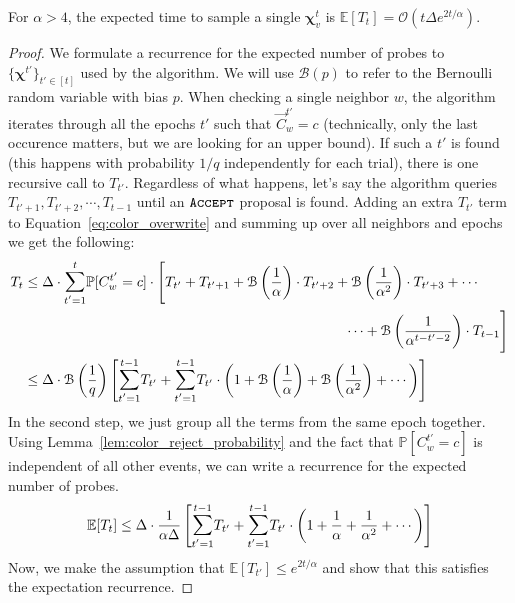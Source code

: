 \begin{lemma}
\label{lem:coloring_recurrence}
For $\alpha>4$, the expected time to sample a single $\bm\chi^t_v$ is $\mathbb E[T_t] = \mathcal{O}\left(t\Delta e^{2t/\alpha}\right)$.
\end{lemma}
\begin{proof}
We formulate a recurrence for the expected number of probes to $\{\bm\chi^{t'}\}_{t'\in[t]}$ used by the algorithm.
We will use $\mathcal B(p)$ to refer to the Bernoulli random variable with bias $p$.
When checking a single neighbor $w$, the algorithm iterates through all the epochs $t'$ such that $\vec C^{t'}_w = c$
(technically, only the last occurence matters, but we are looking for an upper bound).
If such a $t'$ is found (this happens with probability $1/q$ independently for each trial), there is one recursive call to $T_{t'}$.
Regardless of what happens, let's say the algorithm queries $T_{t'+1}, T_{t'+2}, \cdots, T_{t-1}$ until an $\texttt{\textsc{Accept}}$ proposal is found.
Adding an extra $T_{t'}$ term to Equation~\ref{eq:color_overwrite} and summing up over all neighbors and epochs we get the following:
\begin{align}
T_{t} &\le \Delta \cdot \mathlarger\sum\limits_{t'=1}^{t} \mathbb P[C^{t'}_w = c]\cdot
\Biggl[ T_{t'} + T_{t'+1} + \mathcal B\left(\frac{1}{\alpha}\right)\cdot T_{t'+2}
+ \mathcal B\left(\frac{1}{\alpha^2}\right)\cdot T_{t'+3} + \cdots\\
&\hspace{23em}
\cdots + \mathcal B\left(\frac{1}{\alpha^{t-t'-2}}\right)\cdot T_{t-1} \Biggr]\\
&\le \Delta\cdot\mathcal B\left( \frac{1}{q}\right) \Biggl[
\mathlarger\sum\limits_{t'=1}^{t-1} T_{t'} +
\mathlarger\sum\limits_{t'=1}^{t-1} T_{t'}\cdot \left(1 + \mathcal B\left(\frac1\alpha\right) + \mathcal B\left(\frac1{\alpha^2}\right) + \cdots\right)
\Biggr]
\end{align}
In the second step, we just group all the terms from the same epoch together.
Using Lemma~\ref{lem:color_reject_probability} and the fact that $\mathbb P[C^{t'}_w = c]$ is independent of all other events,
we can write a recurrence for the expected number of probes.
\begin{align}
\mathbb E[T_t]\le \Delta\cdot\frac{1}{\alpha\Delta}
\left[
\mathlarger\sum\limits_{t'=1}^{t-1} T_{t'} + \mathlarger\sum\limits_{t'=1}^{t-1} T_{t'}\cdot
\left(1 + \frac1\alpha + \frac1{\alpha^2} + \cdots\right)
\right]
\end{align}
Now, we make the assumption that $\mathbb E[T_{t'}]\le e^{2t/\alpha}$ and show that this satisfies the expectation recurrence.

\end{proof}
